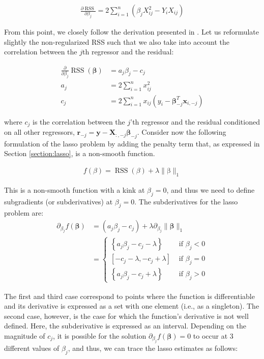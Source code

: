 \begin{align*}
   \frac{\partial \operatorname{RSS}}{\partial \beta_{j}}=2\sum_{i=1}^{n}\left(\beta_{j} X_{ij}^{2}- Y_{i} X_{ij}\right) 
\end{align*}

\noindent From this point, we closely follow the derivation presented in \cite{murphy2012machine}. Let us reformulate slightly the non-regularized RSS such that we also take into account the correlation between the $j$th regressor and the residual: 

\begin{align*}
\frac{\partial}{\partial \beta_{j}} \operatorname{RSS}(\mathbf{\beta}) &=a_{j} \beta_{j}-c_{j} \\
a_{j} &=2 \sum_{i=1}^{n} x_{i j}^{2} \\
c_{j} &=2 \sum_{i=1}^{n} x_{i j}\left(y_{i}-\mathbf{\beta}_{-j}^{T} \mathbf{x}_{i,-j}\right)
\end{align*}

\noindent where $c_j$ is the correlation between the $j$'th regressor and the residual conditioned on all other regressors, $\mathbf{r}_{-j}=\mathbf{y}-\mathbf{X}_{:,-j} \mathbf{\beta}_{-j}$. Consider now the following formulation of the lasso problem by adding the penalty term that, as expressed in Section \ref{section:lasso}, is a non-smooth function. 

\begin{align*}
f(\beta)=\operatorname{RSS}(\beta)+\lambda\|\mathrm{\beta}\|_{1}
\end{align*}

\noindent This is a non-smooth function with a kink at $\beta_{j}=0$, and thus we need to define subgradients (or subderivatives) at $\beta_{j}=0$. The subderivatives for the lasso problem are:
\begin{align*}
\partial_{\beta_{j}} f(\mathbf{\beta}) &=\left(a_{j} \beta_{j}-c_{j}\right)+\lambda \partial_{\beta_{j}}\|\mathbf{\beta}\|_{1} \\
&=\left\{\begin{array}{cl}
\left\{a_{j} \beta_{j}-c_{j}-\lambda\right\} & \text { if } \beta_{j}<0 \\
{\left[-c_{j}-\lambda,-c_{j}+\lambda\right]} & \text { if } \beta_{j}=0 \\
\left\{a_{j} \beta_{j}-c_{j}+\lambda\right\} & \text { if } \beta_{j}>0
\end{array}\right.
\end{align*}

\noindent The first and third case correspond to points where the function is differentiable and its derivative is expressed as a set with one element (i.e., as a singleton). The second case, however, is the case for which the function's derivative is not well defined. Here, the subderivative is expressed as an interval. Depending on the magnitude of $c_j$, it is possible for the solution $\partial_{\beta_{j}} f(\mathbf{\beta})=0$ to occur at 3 different values of $\beta_j$, and thus, we can trace the lasso estimates as follows:

